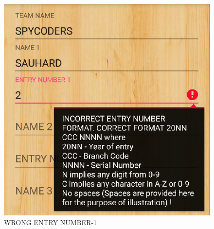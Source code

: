 \documentclass[12pt]{article}
\begin{document}
\begin{itemize}
\begin{enumerate}
        \end{enumerate} 
	\begin{itemize}
	\begin{figure}
	\centering
	\includegraphics[scale=.7]{WRONG_ENTRY_NUM.png}
	\caption{WRONG ENTRY NUMBER-1}
\end{figure}


\end{itemize}
\end{itemize}
\end{document}
